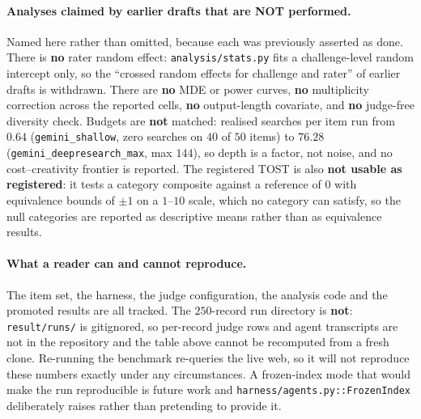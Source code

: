 \paragraph{Analyses claimed by earlier drafts that are NOT performed.} Named here rather than
omitted, because each was previously asserted as done. There is \textbf{no} rater random effect:
\texttt{analysis/stats.py} fits a challenge-level random intercept only, so the ``crossed random
effects for challenge and rater'' of earlier drafts is withdrawn. There are \textbf{no} MDE or power
curves, \textbf{no} multiplicity correction across the reported cells, \textbf{no} output-length
covariate, and \textbf{no} judge-free diversity check. Budgets are \textbf{not} matched: realised
searches per item run from $0.64$ (\texttt{gemini\_shallow}, zero searches on $40$ of $50$ items) to
$76.28$ (\texttt{gemini\_deepresearch\_max}, max $144$), so depth is a factor, not noise, and no cost--creativity
frontier is reported. The registered TOST is also \textbf{not usable as registered}: it tests a
category composite against a reference of $0$ with equivalence bounds of $\pm1$ on a $1$--$10$
scale, which no category can satisfy, so the null categories are reported as descriptive means
rather than as equivalence results.

\paragraph{What a reader can and cannot reproduce.} The item set, the harness, the judge
configuration, the analysis code and the promoted results are all tracked. The $250$-record run
directory is \textbf{not}: \texttt{result/runs/} is gitignored, so per-record judge rows and agent
transcripts are not in the repository and the table above cannot be recomputed from a fresh clone.
Re-running the benchmark re-queries the live web, so it will not reproduce these numbers exactly
under any circumstances. A frozen-index mode that would make the run reproducible is future work and
\texttt{harness/agents.py::FrozenIndex} deliberately raises rather than pretending to provide it.
